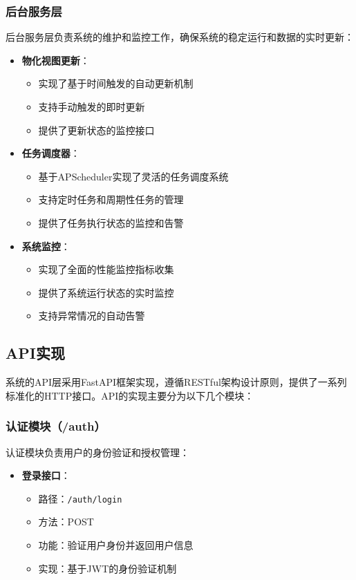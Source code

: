   
\subsubsection{后台服务层}
后台服务层负责系统的维护和监控工作，确保系统的稳定运行和数据的实时更新：

\begin{itemize}
    \item \textbf{物化视图更新}：
    \begin{itemize}
        \item 实现了基于时间触发的自动更新机制
        \item 支持手动触发的即时更新
        \item 提供了更新状态的监控接口
    \end{itemize}
    
    \item \textbf{任务调度器}：
    \begin{itemize}
        \item 基于APScheduler实现了灵活的任务调度系统
        \item 支持定时任务和周期性任务的管理
        \item 提供了任务执行状态的监控和告警
    \end{itemize}
    
    \item \textbf{系统监控}：
    \begin{itemize}
        \item 实现了全面的性能监控指标收集
        \item 提供了系统运行状态的实时监控
        \item 支持异常情况的自动告警
    \end{itemize}
\end{itemize}


\subsection{API实现}

系统的API层采用FastAPI框架实现，遵循RESTful架构设计原则，提供了一系列标准化的HTTP接口。API的实现主要分为以下几个模块：

\subsubsection{认证模块（/auth）}
认证模块负责用户的身份验证和授权管理：

\begin{itemize}
    \item \textbf{登录接口}：
    \begin{itemize}
        \item 路径：\texttt{/auth/login}
        \item 方法：POST
        \item 功能：验证用户身份并返回用户信息
        \item 实现：基于JWT的身份验证机制
    \end{itemize}
\end{itemize}

